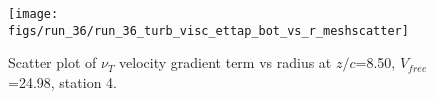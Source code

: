\begin{figure}[H]
\centering
\texttt{[image: figs/run\_36/run\_36\_turb\_visc\_ettap\_bot\_vs\_r\_meshscatter]}
\caption{Scatter plot of $\nu_T$ velocity gradient term vs radius at $z/c$=8.50, $V_{free}$=24.98, station 4.}
\label{fig:run_36_turb_visc_ettap_bot_vs_r_meshscatter}
\end{figure}


